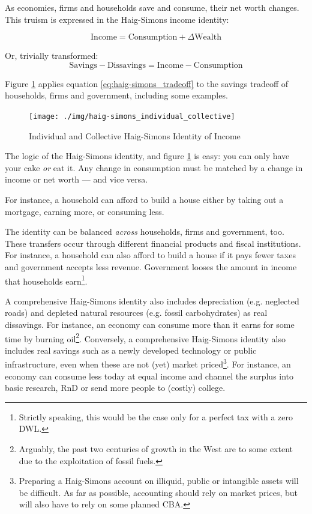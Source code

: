 As economies, firms and households save and consume, their net worth changes. This truism is expressed in the Haig-Simons income identity:

\begin{equation} \label{eq:haig-simons}
			\text{Income}=\text{Consumption}+\Delta\text{Wealth}
\end{equation}

Or, trivially transformed:
\begin{equation} \label{eq:haig-simons_tradeoff}
			\text{Savings}-\text{Dissavings}=\text{Income}-\text{Consumption}
\end{equation}

Figure \ref{fig:haig-simons_individual_collective} applies equation \ref{eq:haig-simons_tradeoff} to the savings tradeoff of households, firms and government, including some examples. 

\begin{figure}[htbp]
	\centering
	\texttt{[image: ./img/haig-simons\_individual\_collective]}  
	\caption{Individual and Collective Haig-Simons Identity of Income}
	\label{fig:haig-simons_individual_collective} %
\end{figure}

The logic of the Haig-Simons identity, and figure \ref{fig:haig-simons_individual_collective} is easy: you can only have your cake \emph{or} eat it. Any change in consumption must be matched by a change in income or net worth --- and vice versa. 

For instance, a household can afford to build a house either by taking out a mortgage, earning more, or consuming less. 

The identity can be balanced \emph{across} households, firms and government, too. These transfers occur through different financial products and fiscal institutions. For instance, a household can also afford to build a house if it pays fewer taxes and government accepts less revenue. Government looses the amount in income that households earn\footnote{
	Strictly speaking, this would be the case only for a perfect tax with a zero \gls{DWL}.}. 

A comprehensive Haig-Simons identity also includes depreciation (e.g. neglected roads) and depleted natural resources (e.g. fossil carbohydrates) as real dissavings. For instance, an economy can consume more than it earns for some time by burning oil\footnote{
	Arguably, the past two centuries of growth in the West are to some extent due to the exploitation of fossil fuels.}. %
Conversely, a comprehensive Haig-Simons identity also includes real savings such as a newly developed technology or public infrastructure, even when these are not (yet) market priced\footnote{
	Preparing a Haig-Simons account on illiquid, public or intangible assets will be difficult. As far as possible, accounting should rely on market prices, but will also have to rely on  some planned \gls{CBA}.}. 
For instance, an economy can consume less today at equal income and channel the surplus into basic research, \gls{RnD} or send more people to (costly) college.

